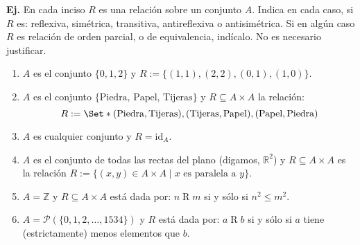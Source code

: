 \documentclass[letterpaper,DIV=14,headsepline,12pt]{scrartcl}
\providecommand\st{\;|\;}
\newcounter{Ejer}
\newcommand{\pts}{}
\newenvironment{ejercicio}[1]{\noindent
    \ifthenelse{\equal{#1}{1} \OR \equal{#1}{+1}}{\renewcommand{\pts}{\textbf{(#1 pt)}}}{\renewcommand{\pts}{\textbf{(#1 pts)}}}\textbf{Ej. \theEjer} \pts\stepcounter{Ejer}}{\vspace{.3cm}}
\newcommand{\id}{\mathrm{id}}
\begin{document}
    \begin{ejercicio}{1}
        En cada inciso $R$ es una relación sobre un conjunto $A$. Indica en cada caso, si $R$ es: reflexiva, simétrica, transitiva, antireflexiva o antisimétrica. Si en algún caso $R$ es relación de orden parcial, o de equivalencia, indícalo. No es necesario justificar.
        \begin{enumerate}
            \item $A$ es el conjunto $\{0,1,2\}$ y $R:=\{(1,1),(2,2),(0,1),(1,0)\}$.

            \item $A$ es el conjunto $\{\text{Piedra, Papel, Tijeras}\}$ y $R \subseteq A \times A$ la relación:
            \[ R := \Set*{(\text{Piedra}, \text{Tijeras}), (\text{Tijeras}, \text{Papel}), (\text{Papel}, \text{Piedra})} \]
 
            \item $A$ es cualquier conjunto y $R=\id_A$.

            \item $A$ es el conjunto de todas las rectas del plano (digamos, $\mathbb{R}^2$) y $R \subseteq A \times A$ es la relación $R:=\{(x,y) \in A \times A \st x \text{ es paralela a } y\}$.
            
            \item $A=\mathbb{Z}$ y $R \subseteq A \times A$ está dada por: $n \mathrel{R} m$ si y sólo si $n ^2 \leq m^2$.

            \item $A=\mathscr{P}(\{0,1,2,\dotsc,1534\})$ y $R$ está dada por: $a \mathrel{R} b$ si y sólo si $a$ tiene (estrictamente) menos elementos que $b$.
        \end{enumerate}
    \end{ejercicio}
\end{document}
